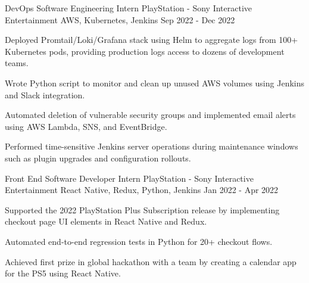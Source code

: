 

\begin{cventries}

  \cventry
    {DevOps Software Engineering Intern} %
    {PlayStation - Sony Interactive Entertainment} %
    {AWS, Kubernetes, Jenkins} %
    {Sep 2022 - Dec 2022} %
    {
      \begin{cvitems} %
        \item {Deployed {Promtail/Loki/Grafana} stack using {Helm} to aggregate logs from 100+ {Kubernetes} pods, providing production logs access to dozens of development teams.}
        \item {Wrote Python script to monitor and clean up unused AWS volumes using {Jenkins} and Slack integration.}
        \item {Automated deletion of vulnerable security groups and implemented email alerts using AWS Lambda, SNS, and EventBridge.}
        \item {Performed {time-sensitive} Jenkins server operations during maintenance windows such as plugin upgrades and configuration rollouts.}
      \end{cvitems}
    }

  \cventry
    {Front End Software Developer Intern} %
    {PlayStation - Sony Interactive Entertainment} %
    {React Native, Redux, Python, Jenkins} %
    {Jan 2022 - Apr 2022} %
    {
      \begin{cvitems} %
        \item {Supported the 2022 PlayStation Plus Subscription release by implementing checkout page UI elements in {React Native} and {Redux}.}
        \item {Automated end-to-end regression tests in {Python} for 20+ checkout flows.} 
        \item {Achieved {first prize} in global hackathon with a team by creating a calendar app for the PS5 using {React Native}.}
      \end{cvitems}
    }


\end{cventries}
